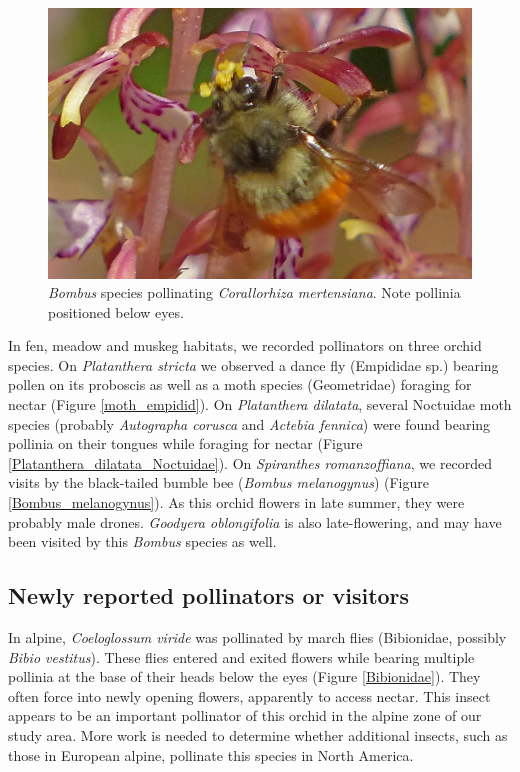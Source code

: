 \begin{multicols}{2}
\begin{figure}[H]
\begin{center}
\vspace{2mm}
\includegraphics[width=\textwidth]{img/Corallorhiza_mertensiana_Bombus.jpg}
\caption{\emph{Bombus} species pollinating \emph{Corallorhiza mertensiana}. Note pollinia positioned below eyes.}
\label{Corallorhiza_mertensiana_Bombus}
\end{center}
\end{figure}

In fen, meadow and muskeg habitats, we recorded pollinators on
three orchid species. On \emph{Platanthera stricta} we observed a
dance fly (Empididae sp.) bearing pollen on its proboscis as well
as a moth species (Geometridae) foraging for nectar (Figure \ref{moth_empidid}). On
\emph{Platanthera dilatata}, several Noctuidae moth species
(probably \emph{Autographa corusca} and \emph{Actebia fennica}) were
found bearing pollinia on their tongues while foraging for nectar
(Figure \ref{Platanthera_dilatata_Noctuidae}). On \emph{Spiranthes romanzoffiana}, we recorded visits by
the black-tailed bumble bee (\emph{Bombus melanogynus}) (Figure \ref{Bombus_melanogynus}). As
this orchid flowers in late summer, they were probably male drones.
\emph{Goodyera oblongifolia} is also late-flowering, and may have been
visited by this \emph{Bombus} species as well.





\subsection{Newly reported pollinators or visitors}

In alpine, \emph{Coeloglossum viride} was pollinated by march flies
(Bibionidae, possibly \emph{Bibio vestitus}). These flies entered and
exited flowers while bearing multiple pollinia at the base of their
heads below the eyes (Figure \ref{Bibionidae}). They often force into newly opening
flowers, apparently to access nectar. This insect appears to be an
important pollinator of this orchid in the alpine zone of our study
area. More work is needed to determine whether additional insects, such
as those in European alpine, pollinate this species in North America.


\end{multicols}
